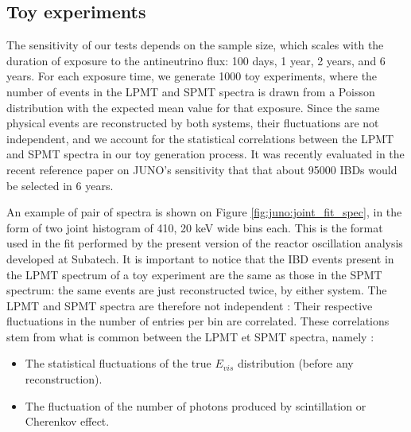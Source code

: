\documentclass[../main.tex]{subfiles}
\begin{document}
%
%

\subsection{Toy experiments}
\label{sec:joint_fit:approach:data_prod}

The sensitivity of our tests depends on the sample size, which scales with the duration of exposure to the antineutrino flux: 100 days, 1 year, 2 years, and 6 years. For each exposure time, we generate 1000 toy experiments, where the number of events in the LPMT and SPMT spectra is drawn from a Poisson distribution with the expected mean value for that exposure. Since the same physical events are reconstructed by both systems, their fluctuations are not independent, and we account for the statistical correlations between the LPMT and SPMT spectra in our toy generation process.
It was recently evaluated in the recent reference paper on JUNO's sensitivity \cite{abusleme_potential_2024} that that about 95000 IBDs would be selected in 6 years.

An example of pair of spectra is shown on Figure \ref{fig:juno:joint_fit_spec}, in the form of two joint histogram of 410, 20 keV wide bins each. This is the format used in the fit performed by the present version of the reactor oscillation analysis developed at Subatech. It is important to notice that the IBD events present in the LPMT spectrum of a toy experiment are the same as those in the SPMT spectrum: the same events are just reconstructed twice, by either system. The LPMT and SPMT spectra are therefore not independent : Their respective fluctuations in the number of entries per bin are correlated. These correlations stem from what is common between the LPMT et SPMT spectra, namely :

\begin{itemize}
  \item The statistical fluctuations of the true $E_{vis}$ distribution (before any reconstruction).
  \item The fluctuation of the number of photons produced by scintillation or Cherenkov effect.
\end{itemize}
\hfill
\end{document}
